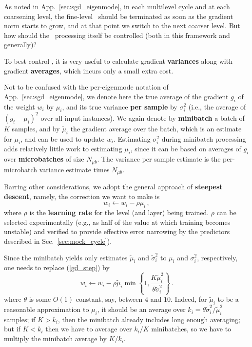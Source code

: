 \documentclass{article} %
\begin{document}
As noted in App.~\ref{sec:sgd_eigenmode}, in each multilevel cycle and at each coarsening level, the fine-level \SGD~should be terminated as soon as the gradient norm starts to grow, and at that point we switch to the next coarser level. But how should the \SGD~processing itself be controlled (both in this framework and generally)?

To best control \SGD, it is very useful to calculate gradient \textbf{variances} along with gradient \textbf{averages}, which incurs only a small extra cost.

Not to be confused with the per-eigenmode notation of App.~\ref{sec:sgd_eigenmode}, we denote here the true average of the gradient $g_i$ of the weight $w_i$ by $\mu_i$, and its true variance \textbf{per sample} by $\sigma_i^2$ (i.e., the average of $(g_i-\mu_i)^2$ over all input instances). We again denote by \textbf{minibatch} a batch of $K$ samples, and by $\tilde{\mu}_i$ the gradient average over the batch, which is an estimate for $\mu_i$, and can be used to update $w_i$. Estimating $\sigma_i^2$ during minibatch processing adds relatively little work to estimating $\mu_i$, since it can be based on averages of $g_i$ over \textbf{microbatches} of size $N_{\mu b}$. The variance per sample estimate is the per-microbatch variance estimate times $N_{\mu b}$.

Barring other considerations, we adopt the general approach of \textbf{steepest descent}, namely, the correction we want to make is
\begin{equation}
  w_i \longleftarrow w_i - \rho \mu_i\,,
  \label{gd_step}
\end{equation}
where $\rho$ is the \textbf{learning rate} for the level (and layer) being trained. $\rho$ can be selected  experimentally (e.g., as half of the value at which training becomes unstable) and verified to provide effective error narrowing by the predictors described in Sec.~\ref{sec:mock_cycle}).

Since the minibatch yields only estimates $\tilde{\mu}_i$ and $\tilde{\sigma}_i^2$ to $\mu_i$ and $\sigma_i^2$, respectively, one needs to replace (\ref{gd_step}) by
\begin{equation}
  w_i \longleftarrow w_i - \rho \tilde{\mu}_i \min\left\{ 1, \frac{K \tilde{\mu}_i^2}{\theta \tilde{\sigma}_i^2} \right\}\,.
  \label{gd_step_k}
\end{equation}
where $\theta$ is some $O(1)$ constant, say, between $4$ and $10$. Indeed, for $\tilde{\mu}_i$ to be a reasonable approximation to $\mu_i$, it should be an average over $k_i = \theta \tilde{\sigma}_i^2/\tilde{\mu}_i^2$ samples; if $K > k_i$, then the minibatch already includes long enough averaging; but if $K < k_i$ then we have to average over $k_i/K$ minibatches, so we have to multiply the minibatch average by $K/k_i$.
\end{document}
